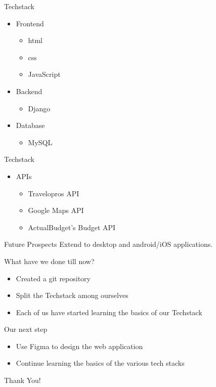\documentclass[14pt]{beamer}
\begin{document}
\begin{frame}{Techstack}
\begin{itemize}
    \item Frontend
    \begin{itemize}
        \item html
        \item css
        \item JavaScript
    \end{itemize} 
    \item Backend
    \begin{itemize}
        \item Django
    \end{itemize} 
    \item Database
    \begin{itemize}
        \item MySQL
    \end{itemize}
\end{itemize}
\end{frame}
\begin{frame}{Techstack}
    \begin{itemize}
        \item APIs
        \begin{itemize}
            \item Travelopros API 
            \item Google Maps API 
            \item ActualBudget's Budget API
        \end{itemize}
\end{itemize}
\end{frame}
\begin{frame}{Future Prospects}
    Extend to desktop and android/iOS applications.
\end{frame}


\begin{frame}{What have we done till now?}
\begin{itemize} 
    \item Created a git repository
    \item Split the Techstack among ourselves 
    \item Each of us have started learning the basics of our Techstack        
\end{itemize}
\end{frame}

\begin{frame}{Our next step}
\begin{itemize} 
    \item Use Figma to design the web application
    \item Continue learning the basics of the various tech stacks
\end{itemize}
\end{frame}
\begin{frame}
    Thank You!
\end{frame}
\end{document}
